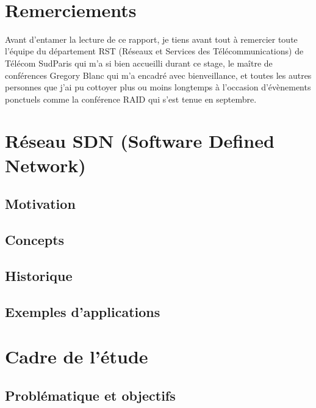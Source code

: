 \documentclass[a4paper]{article}
\begin{document}
\newcommand{\HRule}{\rule{\linewidth}{0.5mm}}



\newpage
~
\section*{\Huge{Remerciements\\}}
\Large Avant d'entamer la lecture de ce rapport, je tiens avant tout à remercier toute l'équipe du département RST (Réseaux et Services des Télécommunications) de Télécom SudParis qui m'a si bien accueilli durant ce stage, le maître de conférences Gregory Blanc qui m'a encadré avec bienveillance, et toutes les autres personnes que j'ai pu cottoyer plus ou moins longtemps à l'occasion d'évènements ponctuels comme la conférence RAID qui s'est tenue en septembre.


\newpage
\tableofcontents


\newpage
{}
\section{Réseau SDN (Software Defined Network)}
	\subsection{Motivation}
		
	\subsection{Concepts}
		
	\subsection{Historique}
	\subsection{Exemples d'applications}
\section{Cadre de l'étude}
	\subsection{Problématique et objectifs}
\end{document}
